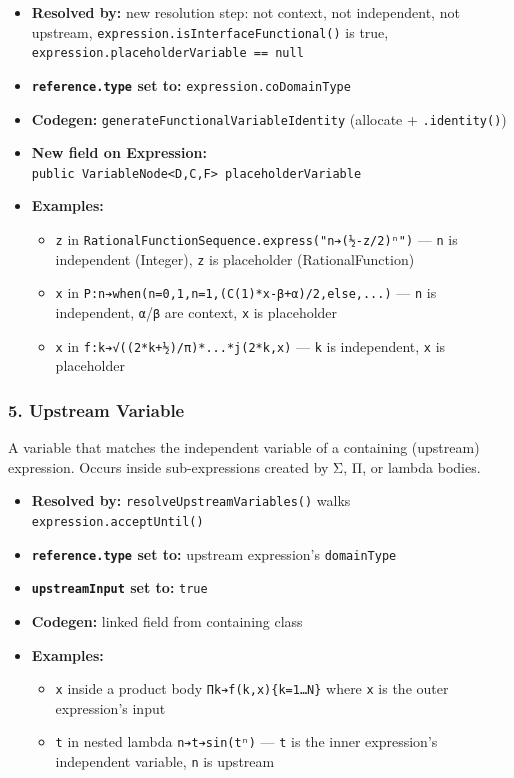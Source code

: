 \documentclass[
]{article}
\providecommand{\tightlist}{%
  \setlength{\itemsep}{0pt}\setlength{\parskip}{0pt}}
\begin{document}
\begin{itemize}
\tightlist
\item
  \textbf{Resolved by:} new resolution step: not context, not
  independent, not upstream, \texttt{expression.isInterfaceFunctional()}
  is true, \texttt{expression.placeholderVariable\ ==\ null}
\item
  \textbf{\texttt{reference.type} set to:}
  \texttt{expression.coDomainType}
\item
  \textbf{Codegen:} \texttt{generateFunctionalVariableIdentity}
  (allocate + \texttt{.identity()})
\item
  \textbf{New field on Expression:}
  \texttt{public\ VariableNode\textless{}D,C,F\textgreater{}\ placeholderVariable}
\item
  \textbf{Examples:}

  \begin{itemize}
  \tightlist
  \item
    \texttt{z} in
    \texttt{RationalFunctionSequence.express("n➔(½-z/2)ⁿ")} ---
    \texttt{n} is independent (Integer), \texttt{z} is placeholder
    (RationalFunction)
  \item
    \texttt{x} in \texttt{P:n➔when(n=0,1,n=1,(C(1)*x-β+α)/2,else,...)}
    --- \texttt{n} is independent, \texttt{α}/\texttt{β} are context,
    \texttt{x} is placeholder
  \item
    \texttt{x} in \texttt{f:k➔√((2*k+½)/π)*...*j(2*k,x)} --- \texttt{k}
    is independent, \texttt{x} is placeholder
  \end{itemize}
\end{itemize}

\subsubsection{5. Upstream Variable}\label{upstream-variable}

A variable that matches the independent variable of a containing
(upstream) expression. Occurs inside sub-expressions created by Σ, Π, or
lambda bodies.

\begin{itemize}
\tightlist
\item
  \textbf{Resolved by:} \texttt{resolveUpstreamVariables()} walks
  \texttt{expression.acceptUntil()}
\item
  \textbf{\texttt{reference.type} set to:} upstream expression's
  \texttt{domainType}
\item
  \textbf{\texttt{upstreamInput} set to:} \texttt{true}
\item
  \textbf{Codegen:} linked field from containing class
\item
  \textbf{Examples:}

  \begin{itemize}
  \tightlist
  \item
    \texttt{x} inside a product body \texttt{Πk➔f(k,x)\{k=1…N\}} where
    \texttt{x} is the outer expression's input
  \item
    \texttt{t} in nested lambda \texttt{n➔t➔sin(tⁿ)} --- \texttt{t} is
    the inner expression's independent variable, \texttt{n} is upstream
  \end{itemize}
\end{itemize}
\end{document}
